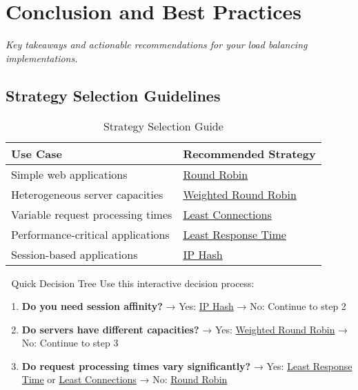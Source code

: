\documentclass[12pt,a4paper]{article}
\begin{document}
\section{Conclusion and Best Practices}

\textit{Key takeaways and actionable recommendations for your load balancing implementations.}

\subsection{Strategy Selection Guidelines}

\begin{table}[H]
\centering
\begin{tabular}{@{}lp{10cm}@{}}
\toprule
\textbf{Use Case} & \textbf{Recommended Strategy} \\
\midrule
Simple web applications & \hyperref[subsec:roundrobin]{Round Robin} \\
Heterogeneous server capacities & \hyperref[subsec:weighted]{Weighted Round Robin} \\
Variable request processing times & \hyperref[subsec:leastconn]{Least Connections} \\
Performance-critical applications & \hyperref[subsec:leastresponse]{Least Response Time} \\
Session-based applications & \hyperref[subsec:iphash]{IP Hash} \\
\bottomrule
\end{tabular}
\caption{Strategy Selection Guide}
\label{tab:strategy_selection}
\end{table}

\begin{infobox}{🎯 Quick Decision Tree}
Use this interactive decision process:
\begin{enumerate}
    \item \textbf{Do you need session affinity?} 
          → Yes: \hyperref[subsec:iphash]{IP Hash}
          → No: Continue to step 2
    \item \textbf{Do servers have different capacities?}
          → Yes: \hyperref[subsec:weighted]{Weighted Round Robin}
          → No: Continue to step 3
    \item \textbf{Do request processing times vary significantly?}
          → Yes: \hyperref[subsec:leastresponse]{Least Response Time} or \hyperref[subsec:leastconn]{Least Connections}
          → No: \hyperref[subsec:roundrobin]{Round Robin}
\end{enumerate}
\end{infobox}
\end{document}
